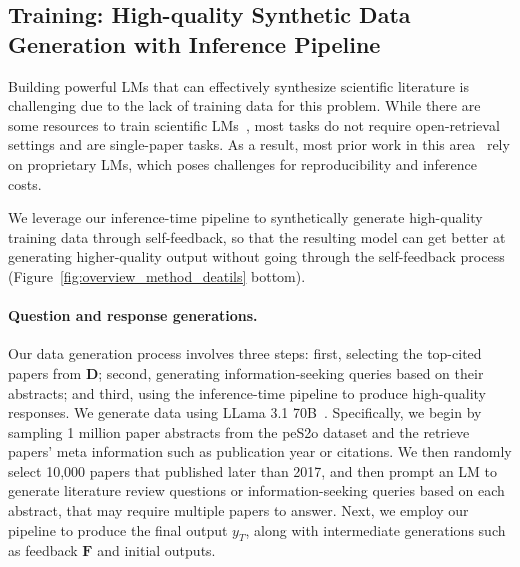 \subsection{Training: High-quality Synthetic Data Generation with Inference Pipeline}
\label{subsec:self_reflective_training}

Building powerful LMs that can effectively synthesize scientific literature is challenging due to the lack of training data for this problem. While there are some resources to train scientific LMs~\citep{wadden2024sciriff}, most tasks do not require open-retrieval settings and are single-paper tasks. As a result, most prior work in this area~\citep{skarlinski2024language} rely on proprietary LMs, which poses challenges for reproducibility and inference costs.  

We leverage our inference-time pipeline to synthetically generate high-quality training data through self-feedback, so that the resulting model can get better at generating higher-quality output without going through the self-feedback process (Figure~\ref{fig:overview_method_deatils} bottom). 

\paragraph{Question and response generations.}
Our data generation process involves three steps: first, selecting the top-cited papers from $\mathbf{D}$; second, generating information-seeking queries based on their abstracts; and third, using the \model inference-time pipeline to produce high-quality responses. 
We generate data using LLama 3.1 70B~\citep{dubey2024llama}. 
Specifically, we begin by sampling 1 million paper abstracts from the peS2o dataset and the retrieve papers' meta information such as publication year or citations. 
We then randomly select 10,000 papers that published later than 2017, and then prompt an LM to generate literature review questions or information-seeking queries based on each abstract, that may require multiple papers to answer. 
Next, we employ our \model pipeline to produce the final output $y_T$, along with intermediate generations such as feedback $\mathbf{F}$ and initial outputs. 

